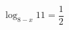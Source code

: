 \begin{ex}[type=equation]
	\begin{condition}
		$\log_{8 - x} 11 = \dfrac{1}{2}$
	\end{condition}
\end{ex}